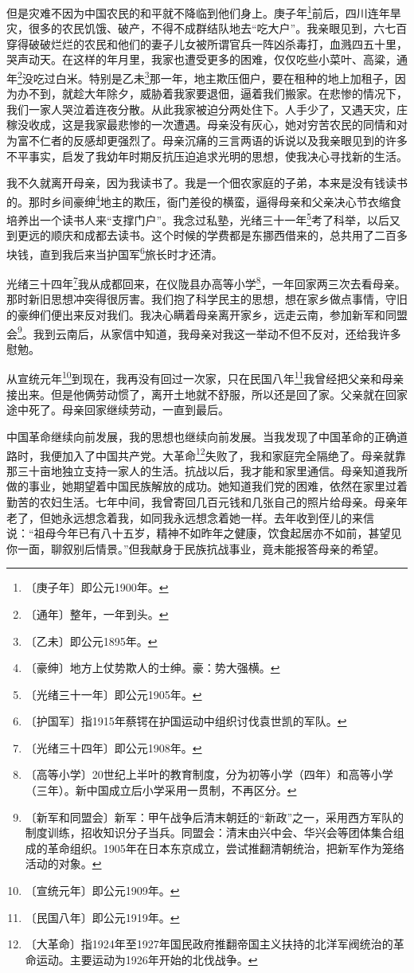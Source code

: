 \documentclass[12pt,UTF-8,openany]{ctexbook}
\begin{document}
\begin{large}
    但是灾难不因为中国农民的和平就不降临到他们身上。庚子年\footnote{〔庚子年〕即公元1900年。}前后，四川连年旱灾，很多的农民饥饿、破产，不得不成群结队地去“吃大户”。我亲眼见到，六七百穿得破破烂烂的农民和他们的妻子儿女被所谓官兵一阵凶杀毒打，血溅四五十里，哭声动天。在这样的年月里，我家也遭受更多的困难，仅仅吃些小菜叶、高粱，通年\footnote{〔通年〕整年，一年到头。}没吃过白米。特别是乙未\footnote{〔乙未〕即公元1895年。}那一年，地主欺压佃户，要在租种的地上加租子，因为办不到，就趁大年除夕，威胁着我家要退佃，逼着我们搬家。在悲惨的情况下，我们一家人哭泣着连夜分散。从此我家被迫分两处住下。人手少了，又遇天灾，庄稼没收成，这是我家最悲惨的一次遭遇。母亲没有灰心，她对穷苦农民的同情和对为富不仁者的反感却更强烈了。母亲沉痛的三言两语的诉说以及我亲眼见到的许多不平事实，启发了我幼年时期反抗压迫追求光明的思想，使我决心寻找新的生活。
    
    我不久就离开母亲，因为我读书了。我是一个佃农家庭的子弟，本来是没有钱读书的。那时乡间豪绅\footnote{〔豪绅〕地方上仗势欺人的士绅。豪：势大强横。}地主的欺压，衙门差役的横蛮，逼得母亲和父亲决心节衣缩食培养出一个读书人来“支撑门户”。我念过私塾，光绪三十一年\footnote{〔光绪三十一年〕即公元1905年。}考了科举，以后又到更远的顺庆和成都去读书。这个时候的学费都是东挪西借来的，总共用了二百多块钱，直到我后来当护国军\footnote{〔护国军〕指1915年蔡锷在护国运动中组织讨伐袁世凯的军队。}旅长时才还清。
    
    光绪三十四年\footnote{〔光绪三十四年〕即公元1908年。}我从成都回来，在仪陇县办高等小学\footnote{〔高等小学〕20世纪上半叶的教育制度，分为初等小学（四年）和高等小学（三年）。新中国成立后小学采用一贯制，不再区分。}，一年回家两三次去看母亲。那时新旧思想冲突得很厉害。我们抱了科学民主的思想，想在家乡做点事情，守旧的豪绅们便出来反对我们。我决心瞒着母亲离开家乡，远走云南，参加新军和同盟会\footnote{〔新军和同盟会〕新军：甲午战争后清末朝廷的“新政”之一，采用西方军队的制度训练，招收知识分子当兵。同盟会：清末由兴中会、华兴会等团体集合组成的革命组织。1905年在日本东京成立，尝试推翻清朝统治，把新军作为笼络活动的对象。}。我到云南后，从家信中知道，我母亲对我这一举动不但不反对，还给我许多慰勉。
    
    从宣统元年\footnote{〔宣统元年〕即公元1909年。}到现在，我再没有回过一次家，只在民国八年\footnote{〔民国八年〕即公元1919年。}我曾经把父亲和母亲接出来。但是他俩劳动惯了，离开土地就不舒服，所以还是回了家。父亲就在回家途中死了。母亲回家继续劳动，一直到最后。
    
    中国革命继续向前发展，我的思想也继续向前发展。当我发现了中国革命的正确道路时，我便加入了中国共产党。大革命\footnote{〔大革命〕指1924年至1927年国民政府推翻帝国主义扶持的北洋军阀统治的革命运动。主要运动为1926年开始的北伐战争。}失败了，我和家庭完全隔绝了。母亲就靠那三十亩地独立支持一家人的生活。抗战以后，我才能和家里通信。母亲知道我所做的事业，她期望着中国民族解放的成功。她知道我们党的困难，依然在家里过着勤苦的农妇生活。七年中间，我曾寄回几百元钱和几张自己的照片给母亲。母亲年老了，但她永远想念着我，如同我永远想念着她一样。去年收到侄儿的来信说：“祖母今年已有八十五岁，精神不如昨年之健康，饮食起居亦不如前，甚望见你一面，聊叙别后情景。”但我献身于民族抗战事业，竟未能报答母亲的希望。
    

\end{large}
\end{document}
